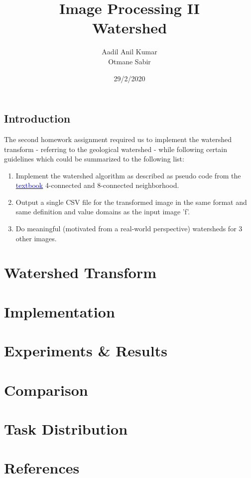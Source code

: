\documentclass{article}
\begin{document}
\title{Image Processing II\\
 Watershed}
\author{Aadil Anil Kumar \\
Otmane Sabir
}
\date{29/2/2020}
\maketitle
\vspace{10mm}
\begin{center}
\section*{Introduction}
\large
The second homework assignment required us to implement the watershed transform - referring to the geological watershed - while following certain guidelines which could be summarized to the following list: 
\vspace{7mm}
\begin{enumerate}
    \item Implement the watershed algorithm as described as pseudo code from the \hyperref[sec:hello]{\textcolor{blue}{textbook}} 4-connected and 8-connected neighborhood.
    \item Output a single CSV file for the transformed image in the same format and same definition and value domains as the input image 'f'.
    \item Do meaningful (motivated from a real-world perspective) watersheds for 3 other images.
\end{enumerate}
\end{center}
\newpage

\tableofcontents

\newpage

\section{Watershed Transform}

\section{Implementation}


\section{Experiments & Results}


\section{Comparison}


\section{Task Distribution}


\section{References} 
\label{sec:hello}
\end{document}
